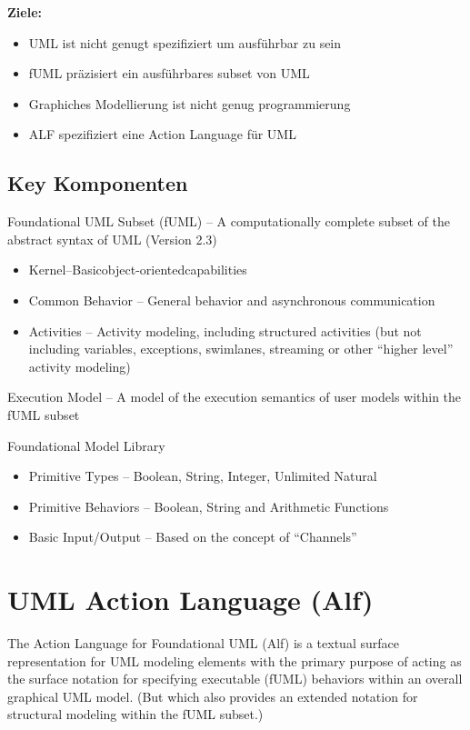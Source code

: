 \textbf{Ziele:}
\begin{itemize}
\item UML ist nicht genugt spezifiziert um ausführbar zu sein
\item fUML präzisiert ein ausführbares subset von UML
\item Graphiches Modellierung ist nicht genug programmierung
\item ALF spezifiziert eine Action Language für UML
\end{itemize}

\subsection{Key Komponenten}

Foundational UML Subset (fUML) – A computationally complete subset of the abstract syntax of UML (Version 2.3)
\begin{itemize}
\item Kernel–Basicobject-orientedcapabilities
\item Common Behavior – General behavior and asynchronous communication
\item Activities – Activity modeling, including structured activities (but not including variables, exceptions, swimlanes, streaming or other “higher level” activity modeling)
\end{itemize}

Execution Model – A model of the execution semantics of user models within the fUML subset

Foundational Model Library
\begin{itemize}
\item Primitive Types – Boolean, String, Integer, Unlimited Natural
\item Primitive Behaviors – Boolean, String and Arithmetic Functions
\item Basic Input/Output – Based on the concept of “Channels”
\end{itemize}

\section{UML Action Language (Alf)}

The Action Language for Foundational UML (Alf) is a textual surface representation for UML modeling elements with the primary purpose of acting as the surface notation for specifying executable (fUML) behaviors within an overall graphical UML model. (But which also provides an extended notation for structural modeling within the fUML subset.)


